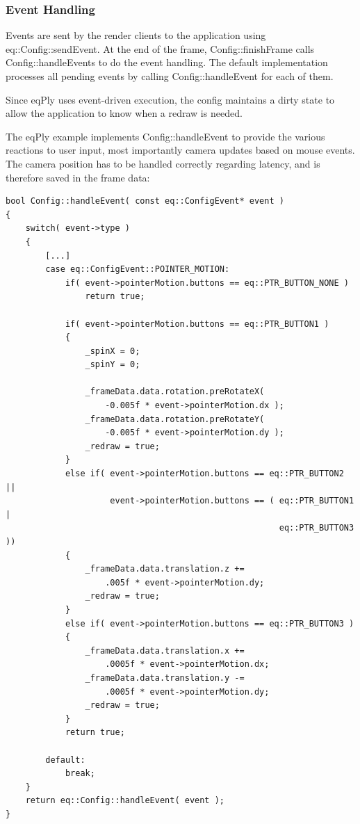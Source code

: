 \documentclass[10pt,a4]{scrartcl}
\begin{document}
\subsubsection{Event Handling}

Events are sent by the render clients to the application using
\textsf{eq::Config::sendEvent}. At the end of the frame,
\textsf{Config::finishFrame} calls \textsf{Config::handleEvents} to do
the event handling. The default implementation processes all pending
events by calling \textsf{Config::handleEvent} for each of them.

Since \textsf{eqPly} uses event-driven execution, the config maintains a
dirty state to allow the application to know when a redraw is needed.

The \textsf{eqPly} example implements \textsf{Config::hand\-le\-Event}
to provide the various reactions to user input, most importantly camera
updates based on mouse events. The camera position has to be handled
correctly regarding latency, and is therefore saved in the frame data:

{\footnotesize\begin{lstlisting}
bool Config::handleEvent( const eq::ConfigEvent* event )
{
    switch( event->type )
    {
        [...]
        case eq::ConfigEvent::POINTER_MOTION:
            if( event->pointerMotion.buttons == eq::PTR_BUTTON_NONE )
                return true;

            if( event->pointerMotion.buttons == eq::PTR_BUTTON1 )
            {
                _spinX = 0;
                _spinY = 0;

                _frameData.data.rotation.preRotateX( 
                    -0.005f * event->pointerMotion.dx );
                _frameData.data.rotation.preRotateY(
                    -0.005f * event->pointerMotion.dy );
                _redraw = true;
            }
            else if( event->pointerMotion.buttons == eq::PTR_BUTTON2 ||
                     event->pointerMotion.buttons == ( eq::PTR_BUTTON1 |
                                                       eq::PTR_BUTTON3 ))
            {
                _frameData.data.translation.z +=
                    .005f * event->pointerMotion.dy;
                _redraw = true;
            }
            else if( event->pointerMotion.buttons == eq::PTR_BUTTON3 )
            {
                _frameData.data.translation.x += 
                    .0005f * event->pointerMotion.dx;
                _frameData.data.translation.y -= 
                    .0005f * event->pointerMotion.dy;
                _redraw = true;
            }
            return true;
            
        default:
            break;
    }
    return eq::Config::handleEvent( event );
}
\end{lstlisting}}
\end{document}
